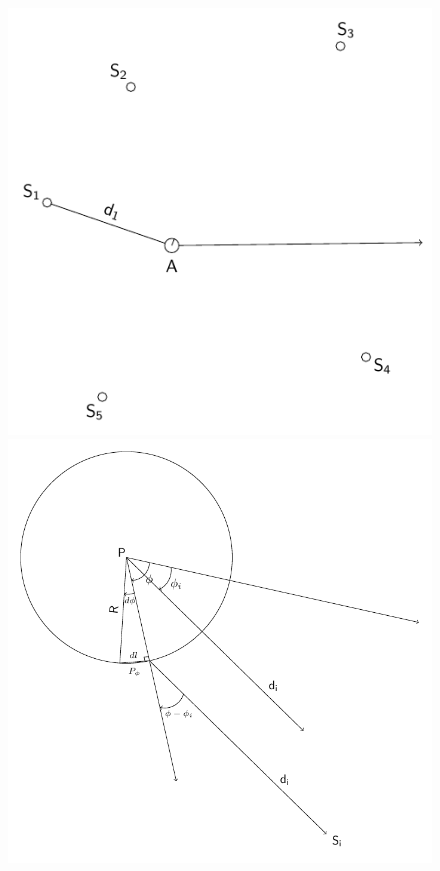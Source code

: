 \begin{figure}[h]
\begin{minipage}{.5\linewidth}
	\centering
	\includegraphics[scale=.75]{groupSensor_Version2.pdf}
\end{minipage}\hfill
\begin{minipage}{.5\linewidth}
	\centering
	\includegraphics[scale=.6]{exposure.pdf}
\end{minipage}
\end{figure}

